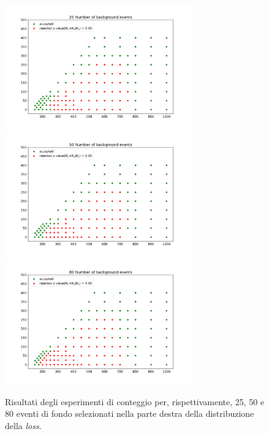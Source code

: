 \newpage

\begin{figure}[h!]
	\centering
	\includegraphics[width=0.72\textwidth]{figs/risultati_simulazione/25.pdf}
	\includegraphics[width=0.72\textwidth]{figs/risultati_simulazione/50.pdf}
	\includegraphics[width=0.72\textwidth]{figs/risultati_simulazione/80.pdf}
	\caption{Risultati degli esperimenti di conteggio per, rispettivamente, 25, 50 e 80 eventi di fondo selezionati nella parte destra della distribuzione della \textit{loss}.}
	\label{test-25-50-80}
\end{figure}

